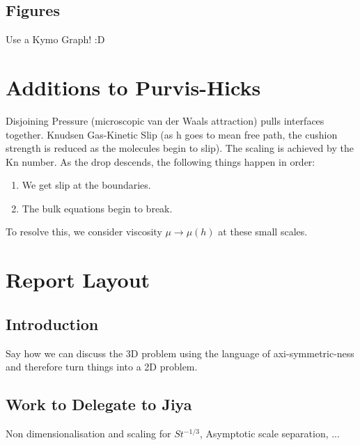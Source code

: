 \documentclass[11pt,a4paper]{article}
\begin{document}
	\subsection{Figures}
	Use a Kymo Graph! :D
	
	
	
	
	\section{Additions to Purvis-Hicks}
	Disjoining Pressure (microscopic van der Waals attraction) pulls interfaces together. Knudsen Gas-Kinetic Slip (as h goes to mean free path, the cushion strength is reduced as the molecules begin to slip). The scaling is achieved by  the $\text{Kn}$ number. As the drop descends, the following things happen in order:
	\begin{enumerate}
		\item We get slip at the boundaries. 
		\item The bulk equations begin to break.
	\end{enumerate}
	To resolve this, we consider viscosity $\mu \to \mu(h)$ at these small scales.
	
	
	
	\section{Report Layout}
	\subsection{Introduction}
	Say how we can discuss the 3D problem using the language of axi-symmetric-ness and therefore turn things into a 2D problem.
	
	\subsection{Work to Delegate to Jiya}
	Non dimensionalisation and scaling for $St^{-1/3}$, Asymptotic scale separation, ...
	
\end{document}
